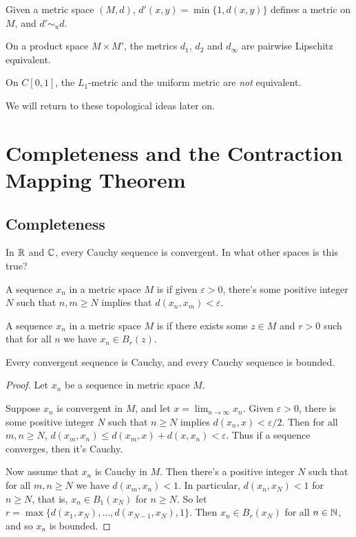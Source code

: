 \documentclass[a4paper]{scrartcl}
\begin{document}
\begin{example}
    Given a metric space $(M, d)$, $d'(x, y) = \min\{1, d(x, y)\}$ defines a metric on $M$, and $d' \sim_u d$.
\end{example}

\begin{example}
    On a product space $M \times M'$, the metrics $d_1$, $d_2$ and $d_{\infty}$ are pairwise Lipschitz equivalent.
\end{example}

\begin{example}
    On $C[0, 1]$, the $L_1$-metric and the uniform metric are \emph{not} equivalent.
\end{example}

We will return to these topological ideas later on.

\section{Completeness and the Contraction Mapping Theorem}

\subsection{Completeness}

In $\mathbb{R}$ and $\mathbb{C}$, every Cauchy sequence is convergent. In what other spaces is this true?

\begin{definition}
    A sequence $x_n$ in a metric space $M$ is  if given $\varepsilon > 0$, there's some positive integer $N$ such that $n, m \geq N$ implies that $d(x_n, x_m) < \varepsilon$.
\end{definition}

\begin{definition}[Bounded]
    A sequence $x_n$ in a metric space $M$ is  if there exists some $z \in M$ and $r > 0$ such that for all $n$ we have $x_n \in B_r(z)$.
\end{definition}

\begin{lemma}
    Every convergent sequence is Cauchy, and every Cauchy sequence is bounded.
\end{lemma}
\begin{proof}
    Let $x_n$ be a sequence in metric space $M$. 
    
    Suppose $x_n$ is convergent in $M$, and let $x = \lim_{n \to \infty} x_n$.
    Given $\varepsilon > 0$, there is some positive integer $N$ such that $n \geq N$ implies $d(x_n, x) < \varepsilon/2$.
    Then for all $m, n \geq N$, $d(x_m, x_n) \leq d(x_m, x) + d(x, x_n) < \varepsilon$. Thus if a sequence converges, then it's Cauchy.

    Now assume that $x_n$ is Cauchy in $M$. Then there's a positive integer $N$ such that for all $m, n \geq N$ we have $d(x_m, x_n) < 1$. In particular, $d(x_n, x_N) < 1$ for $n \geq N$, that is, $x_n \in B_1(x_N)$ for $n \geq N$.
    So let $r = \max\{d(x_1, x_N), \dots, d(x_{N - 1}, x_N), 1\}$. Then $x_n \in B_r(x_N)$ for all $n \in \mathbb{N}$, and so $x_n$ is bounded.
\end{proof}
\end{document}
